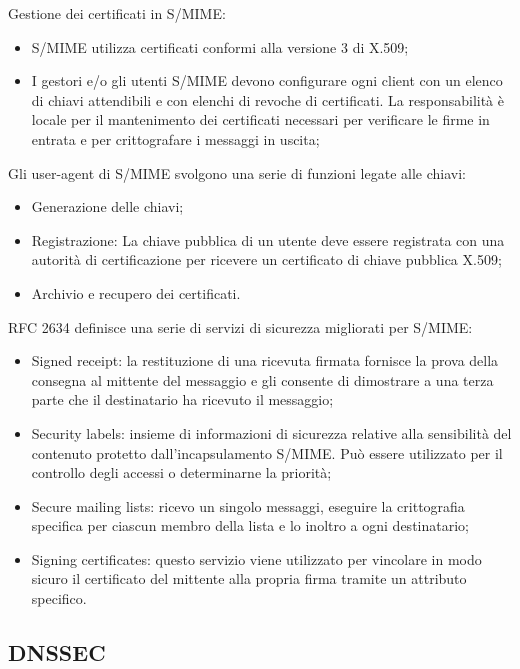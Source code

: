 Gestione dei certificati in S/MIME:
\begin{itemize}
    \item S/MIME utilizza certificati conformi alla versione 3 di X.509;
	\item I gestori e/o gli utenti S/MIME devono configurare ogni client con un elenco di chiavi attendibili e con elenchi di revoche di certificati. La responsabilità è locale per il mantenimento dei certificati necessari per verificare le firme in entrata e per crittografare i messaggi in uscita;
\end{itemize}

Gli user-agent di S/MIME svolgono una serie di funzioni legate alle chiavi:
\begin{itemize}
    \item Generazione delle chiavi;
	\item Registrazione: La chiave pubblica di un utente deve essere registrata con una autorità di certificazione per ricevere un certificato di chiave pubblica X.509;
	\item Archivio e recupero dei certificati.
\end{itemize}

RFC 2634 definisce una serie di servizi di sicurezza migliorati per S/MIME:
\begin{itemize}
    \item Signed receipt: la restituzione di una ricevuta firmata fornisce la prova della consegna al mittente del messaggio e gli consente di dimostrare a una terza parte che il destinatario ha ricevuto il messaggio;
	\item Security labels: insieme di informazioni di sicurezza relative alla sensibilità del contenuto protetto dall'incapsulamento S/MIME. Può essere utilizzato per il controllo degli accessi o determinarne la priorità;
	\item Secure mailing lists: ricevo un singolo messaggi, eseguire la crittografia specifica per ciascun membro della lista e lo inoltro a ogni destinatario;
	\item Signing certificates: questo servizio viene utilizzato per vincolare in modo sicuro il certificato del mittente alla propria firma tramite un attributo specifico.
\end{itemize}

\subsection{DNSSEC}

